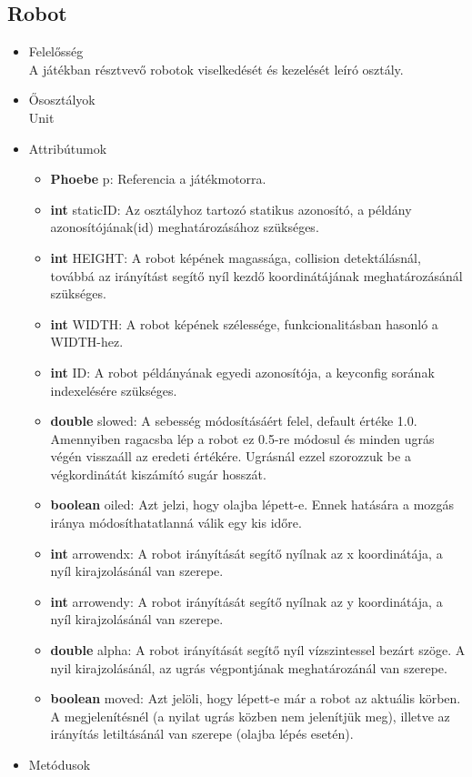 \subsection{Robot}
\begin{itemize}
\item Felelősség\\
A játékban résztvevő robotok viselkedését és kezelését leíró osztály.
\item Ősosztályok\\
Unit
\item Attribútumok
	\begin{itemize}
    	\item \textbf{Phoebe} p: Referencia a játékmotorra.
		\item \textbf{int} staticID: Az osztályhoz tartozó statikus azonosító, a példány                azonosítójának(id) meghatározásához szükséges.
		\item \textbf{int} HEIGHT: A robot képének magassága, collision                      detektálásnál, továbbá az irányítást segítő nyíl kezdő koordinátájának                  meghatározásánál szükséges.
		\item \textbf{int} WIDTH: A robot képének szélessége, funkcionalitásban hasonló a WIDTH-hez.
		\item \textbf{int} ID: A robot példányának egyedi azonosítója, a keyconfig sorának                     indexelésére szükséges.
		\item \textbf{double} slowed: A sebesség módosításáért felel, default értéke 1.0. Amennyiben ragacsba lép a robot ez 0.5-re módosul és minden ugrás végén visszaáll az eredeti értékére. Ugrásnál ezzel szorozzuk be a végkordinátát kiszámító sugár hosszát.
		\item \textbf{boolean} oiled: Azt jelzi, hogy olajba lépett-e. Ennek hatására a mozgás iránya módosíthatatlanná válik egy kis időre. 
		\item \textbf{int} arrowendx: A robot irányítását segítő nyílnak az x koordinátája, a nyíl kirajzolásánál van szerepe.
		\item \textbf{int} arrowendy: A robot irányítását segítő nyílnak az y koordinátája, a nyíl kirajzolásánál van szerepe.
		\item \textbf{double} alpha: A robot irányítását segítő nyíl vízszintessel bezárt szöge. A nyil kirajzolásánál, az ugrás végpontjának meghatározánál van szerepe.
		\item \textbf{boolean} moved: Azt jelöli, hogy lépett-e már a robot az aktuális körben. A megjelenítésnél (a nyilat ugrás közben nem jelenítjük meg), illetve az irányítás letiltásánál van szerepe (olajba lépés esetén).
\end{itemize}
\item Metódusok


\end{itemize}
